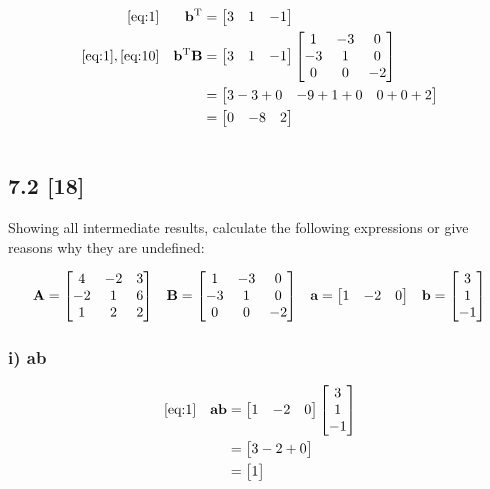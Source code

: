 \documentclass{article}
\begin{document}
\begin{align}
    \label{eq:10}
    \eqref{eq:1} &&
    \textbf{b}\textsuperscript{T} &= \begin{bmatrix}
    3 & 1 & -1
    \end{bmatrix}
    \\
    \label{eq:11}
    \eqref{eq:1}, \eqref{eq:10} &&
    \textbf{b}\textsuperscript{T}\textbf{B} &= \begin{bmatrix}
    3 & 1 & -1
    \end{bmatrix} \begin{bmatrix} 1 & -3 & 0\\ -3 & 1 & 0\\ 0 & 0 & -2 \end{bmatrix}
    \\
    \label{eq:12}
    && &= \begin{bmatrix}
    3-3+0 & -9+1+0 & 0+0+2
    \end{bmatrix}
    \\
    \label{eq:13}
    && &= \begin{bmatrix}
    0 & -8 & 2
    \end{bmatrix}
\end{align}

\par  $ $

\subsection*{7.2 [18]}
\setcounter{equation}{0}

Showing all intermediate results, calculate the following expressions or give reasons why they are undefined:

\def \aamatrix {
\begin{bmatrix}
1 & -2 & 0
\end{bmatrix}
}

\begin{align}
    \label{eq:1}
    \textbf{A} = \Amatrix && \textbf{B} = \Bmatrix && \textbf{a} = \aamatrix && \textbf{b} = \bbmatrix
\end{align}

\subsubsection*{i) \textbf{ab}}

\begin{align}
    \label{eq:2}
    \eqref{eq:1} &&
    \textbf{ab} &= \aamatrix \bbmatrix
    \\
    \label{eq:3}
    && &= \begin{bmatrix}
    3-2+0
    \end{bmatrix}
    \\
    \label{eq:4}
    && &= \begin{bmatrix}
    1
    \end{bmatrix}
\end{align}
\end{document}
